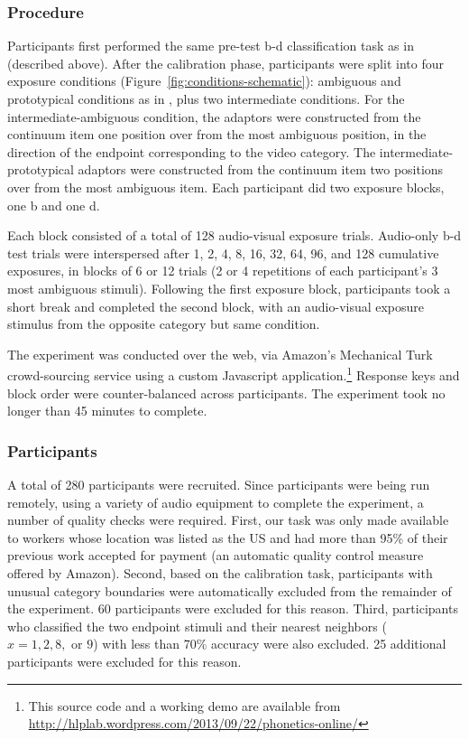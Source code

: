 \subsubsection{Procedure}
\label{sec:procedure}

Participants first performed the same pre-test \ph b-\ph d classification task as in  (described above).
After the calibration phase, participants were split into four exposure conditions (Figure~\ref{fig:conditions-schematic}): ambiguous and prototypical conditions as in , plus two intermediate conditions. For the intermediate-ambiguous condition, the adaptors were constructed from the continuum item one position over from the most ambiguous position, in the direction of the endpoint corresponding to the video category.  The intermediate-prototypical adaptors were constructed from the continuum item two positions over from the most ambiguous item.  Each participant did two exposure blocks, one \ph b and one \ph d.

Each block consisted of a total of 128 audio-visual exposure trials.  Audio-only \ph b-\ph d test trials were interspersed after 1, 2, 4, 8, 16, 32, 64, 96, and 128 cumulative exposures, in blocks of 6 or 12 trials (2 or 4 repetitions of each participant's 3 most ambiguous stimuli).  Following the first exposure block, participants took a short break and completed the second block, with an audio-visual exposure stimulus from the opposite category but same condition.

The experiment was conducted over the web, via Amazon's Mechanical Turk crowd-sourcing service using a custom Javascript application.\footnote{This source code and a working demo are available from \url{http://hlplab.wordpress.com/2013/09/22/phonetics-online/}}  Response keys and block order were counter-balanced across participants.  The experiment took no longer than 45 minutes to complete.

\subsubsection{Participants}
\label{sec:participants}

A total of 280 participants were recruited.  Since participants were being run remotely, using a variety of audio equipment to complete the experiment, a number of quality checks were required.  First, our task was only made available to workers whose location was listed as the US and had more than 95\% of their previous work accepted for payment (an automatic quality control measure offered by Amazon).  Second, based on the calibration task, participants with unusual category boundaries \autocite[most ambiguous stimulus not one of the middle three positions 4, 5, or 6 found by][]{Vroomen2007} were automatically excluded from the remainder of the experiment.  60 participants were excluded for this reason.  Third, participants who classified the two endpoint stimuli and their nearest neighbors ($x=1,2,8,\textrm{ or } 9$) with less than 70\% accuracy were also excluded.  25 additional participants were excluded for this reason.

